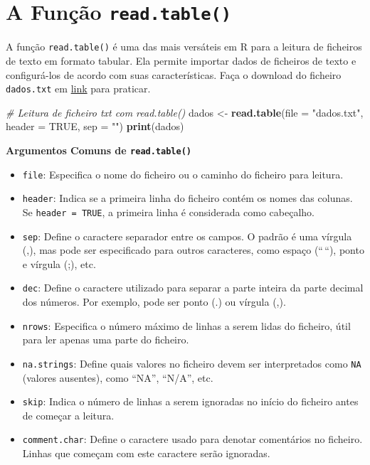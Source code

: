 \documentclass[
]{book}
\newenvironment{Shaded}{\begin{snugshade}}{\end{snugshade}}
\newcommand{\AttributeTok}[1]{\textcolor[rgb]{0.13,0.29,0.53}{#1}}
\newcommand{\CommentTok}[1]{\textcolor[rgb]{0.56,0.35,0.01}{\textit{#1}}}
\newcommand{\ConstantTok}[1]{\textcolor[rgb]{0.56,0.35,0.01}{#1}}
\newcommand{\FunctionTok}[1]{\textcolor[rgb]{0.13,0.29,0.53}{\textbf{#1}}}
\newcommand{\NormalTok}[1]{#1}
\newcommand{\OtherTok}[1]{\textcolor[rgb]{0.56,0.35,0.01}{#1}}
\newcommand{\StringTok}[1]{\textcolor[rgb]{0.31,0.60,0.02}{#1}}
\providecommand{\tightlist}{%
  \setlength{\itemsep}{0pt}\setlength{\parskip}{0pt}}
\begin{document}
\section{\texorpdfstring{A Função \texttt{read.table()}}{A Função read.table()}}\label{a-funuxe7uxe3o-read.table}

A função \texttt{read.table()} é uma das mais versáteis em R para a leitura de
ficheiros de texto em formato tabular. Ela permite importar dados de
ficheiros de texto e configurá-los de acordo com suas características.
Faça o download do ficheiro \texttt{dados.txt} em
\href{https://renatorpaula.wixsite.com/renato/laboratorio-estatistica}{link}
para praticar.

\begin{Shaded}
\begin{Highlighting}[]
\CommentTok{\# Leitura de ficheiro txt com read.table()}
\NormalTok{dados }\OtherTok{\textless{}{-}} \FunctionTok{read.table}\NormalTok{(}\AttributeTok{file =} \StringTok{"dados.txt"}\NormalTok{, }\AttributeTok{header =} \ConstantTok{TRUE}\NormalTok{, }\AttributeTok{sep =} \StringTok{""}\NormalTok{)}
\FunctionTok{print}\NormalTok{(dados)}
\end{Highlighting}
\end{Shaded}

\textbf{Argumentos Comuns de \texttt{read.table()}}

\begin{itemize}
\tightlist
\item
  \texttt{file}: Especifica o nome do ficheiro ou o caminho do ficheiro para
  leitura.
\item
  \texttt{header}: Indica se a primeira linha do ficheiro contém os nomes das
  colunas. Se \texttt{header\ =\ TRUE}, a primeira linha é considerada como
  cabeçalho.
\item
  \texttt{sep}: Define o caractere separador entre os campos. O padrão é uma
  vírgula (,), mas pode ser especificado para outros caracteres, como
  espaço (``\,``), ponto e vírgula (;), etc.
\item
  \texttt{dec}: Define o caractere utilizado para separar a parte inteira da
  parte decimal dos números. Por exemplo, pode ser ponto (.) ou
  vírgula (,).
\item
  \texttt{nrows}: Especifica o número máximo de linhas a serem lidas do
  ficheiro, útil para ler apenas uma parte do ficheiro.
\item
  \texttt{na.strings}: Define quais valores no ficheiro devem ser
  interpretados como \texttt{NA} (valores ausentes), como ``NA'', ``N/A'', etc.
\item
  \texttt{skip}: Indica o número de linhas a serem ignoradas no início do
  ficheiro antes de começar a leitura.
\item
  \texttt{comment.char}: Define o caractere usado para denotar comentários no
  ficheiro. Linhas que começam com este caractere serão ignoradas.
\end{itemize}
\end{document}
